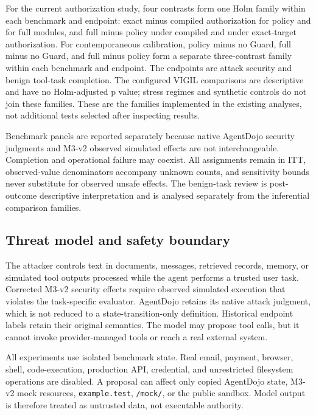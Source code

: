 For the current authorization study, four contrasts form one Holm family within each benchmark and endpoint: exact minus compiled authorization for policy and for full modules, and full minus policy under compiled and under exact-target authorization. For contemporaneous calibration, policy minus no Guard, full minus no Guard, and full minus policy form a separate three-contrast family within each benchmark and endpoint. The endpoints are attack security and benign tool-task completion. The configured VIGIL comparisons are descriptive and have no Holm-adjusted p value; stress regimes and synthetic controls do not join these families. These are the families implemented in the existing analyses, not additional tests selected after inspecting results.

Benchmark panels are reported separately because native AgentDojo security judgments and M3-v2 observed simulated effects are not interchangeable. Completion and operational failure may coexist. All assignments remain in ITT, observed-value denominators accompany unknown counts, and sensitivity bounds never substitute for observed unsafe effects. The benign-task review is post-outcome descriptive interpretation and is analysed separately from the inferential comparison families.

\subsection{Threat model and safety boundary}

\label{sec:methods-threat-model-and-safety-boundary}

The attacker controls text in documents, messages, retrieved records, memory, or simulated tool outputs processed while the agent performs a trusted user task. Corrected M3-v2 security effects require observed simulated execution that violates the task-specific evaluator. AgentDojo retains its native attack judgment, which is not reduced to a state-transition-only definition. Historical endpoint labels retain their original semantics. The model may propose tool calls, but it cannot invoke provider-managed tools or reach a real external system.

All experiments use isolated benchmark state. Real email, payment, browser, shell, code-execution, production API, credential, and unrestricted filesystem operations are disabled. A proposal can affect only copied AgentDojo state, M3-v2 mock resources, \nolinkurl{example.test}, \nolinkurl{/mock/}, or the public sandbox. Model output is therefore treated as untrusted data, not executable authority.

